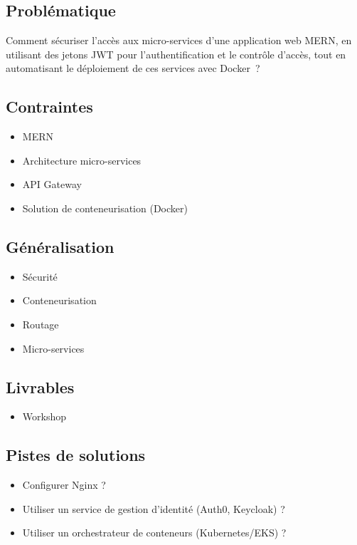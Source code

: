\subsection*{Problématique}
{}
\noindent Comment sécuriser l'accès aux micro-services d'une application web MERN, en utilisant des jetons JWT pour l'authentification et le contrôle d'accès, tout en automatisant le déploiement de ces services avec Docker~?

\subsection*{Contraintes}
{}
\begin{itemize}
	\item MERN
	\item Architecture micro-services
	\item API Gateway
	\item Solution de conteneurisation (Docker)
\end{itemize}

\subsection*{Généralisation}
{}
\begin{itemize}
	\item Sécurité
	\item Conteneurisation
	\item Routage
	\item Micro-services
\end{itemize}

\subsection*{Livrables}
{}
\begin{itemize}
	\item Workshop
\end{itemize}

\subsection*{Pistes de solutions}
{}
\begin{itemize}
	\item Configurer Nginx ?
	\item Utiliser un service de gestion d'identité (Auth0, Keycloak) ?
	\item Utiliser un orchestrateur de conteneurs (Kubernetes/EKS) ?
\end{itemize}

